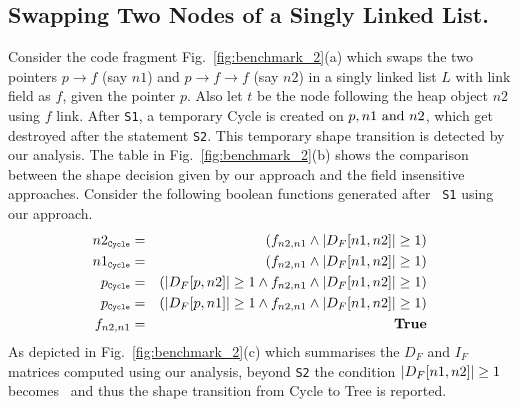 \subsection{Swapping Two Nodes of a Singly Linked List.}
Consider the code fragment Fig.~\ref{fig:benchmark_2}(a)
which swaps the two pointers $p\rightarrow f$ (say $n1$) and $p\rightarrow f\rightarrow f$ (say $n2$) in a
singly linked list $L$ with link field as $f$, given the
pointer $p$. Also let $t$ be the node
following the heap object $n2$ using $f$ link. 
After {\tt S1}, a temporary Cycle is created on $p, n1 \mbox{ and } n2$, which get destroyed
after the statement {\tt S2}. This temporary shape transition is detected by our analysis.
The table in Fig.~\ref{fig:benchmark_2}(b) shows the
comparison between the shape decision given by our approach
and the field insensitive approaches.
Consider the following boolean functions generated after {\tt
  S1} using our approach.
\begin{eqnarray*}
  n2_{\subC} &=&   (f_{n2,n1} \wedge \num{D_F[n1,n2]} \geq 1) \\ 
  n1_{\subC} &=&   (f_{n2,n1} \wedge \num{D_F[n1,n2]} \geq 1) \\ 
  \p_{\subC} &=&   (\num{D_F[p,n2]} \geq 1 \wedge f_{n2,n1} \wedge \num{D_F[n1,n2]} \geq 1) \\ 
  \p_{\subC} &=&   (\num{D_F[p,n1]} \geq 1 \wedge f_{n2,n1} \wedge \num{D_F[n1,n2]} \geq 1) \\
  f_{n2,n1} &=& \true 
\end{eqnarray*}
As depicted in Fig.~\ref{fig:benchmark_2}(c) which summarises the $D_F$ and $I_F$ matrices computed using our analysis, 
beyond {\tt S2} the condition $|D_F[n1,n2]| \geq 1$ becomes \false\ and thus the shape transition from Cycle 
to Tree is reported.


